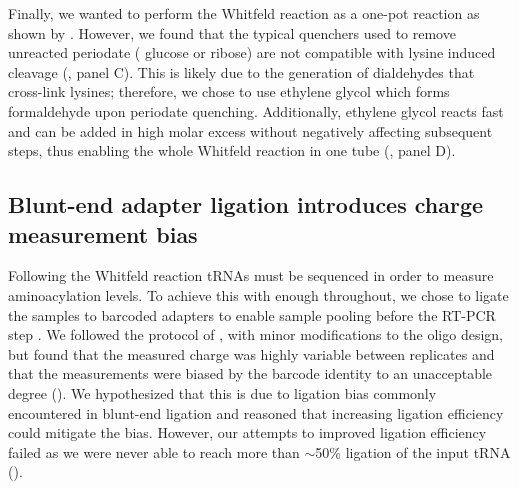 \documentclass[9pt,lineno]{elife}
\begin{document}
Finally, we wanted to perform the Whitfeld reaction as a one-pot reaction as shown by \cite{Watkins2022-er}.
However, we found that the typical quenchers used to remove unreacted periodate ( glucose or ribose) are not compatible with lysine induced cleavage (, panel C).
This is likely due to the generation of dialdehydes that cross-link lysines; therefore, we chose to use ethylene glycol which forms formaldehyde upon periodate quenching.
Additionally, ethylene glycol reacts fast and can be added in high molar excess without negatively affecting subsequent steps, thus enabling the whole Whitfeld reaction in one tube (, panel D).



\subsection{Blunt-end adapter ligation introduces charge measurement bias}
Following the Whitfeld reaction tRNAs must be sequenced in order to measure aminoacylation levels.
To achieve this with enough throughout, we chose to ligate the samples to barcoded adapters to enable sample pooling before the RT-PCR step \citep{McGlincy2017-ro}.
We followed the protocol of \cite{Behrens2021-gb}, with minor modifications to the oligo design, but found that the measured charge was highly variable between replicates and that the measurements were biased by the barcode identity to an unacceptable degree ().
We hypothesized that this is due to ligation bias commonly encountered in blunt-end ligation \citep{Fuchs2015-nb, Zhuang2012-nu, Jayaprakash2011-ab} and reasoned that increasing ligation efficiency could mitigate the bias.
However, our attempts to improved ligation efficiency failed as we were never able to reach more than $\sim$50\% ligation of the input tRNA ().
\end{document}
